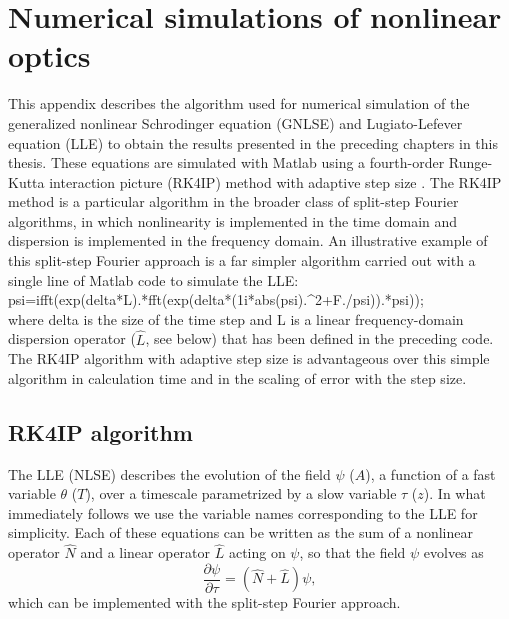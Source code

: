 \chapter{Numerical simulations of nonlinear optics}
 \label{app:numericalsims}



This appendix describes the algorithm used for numerical simulation of the generalized nonlinear Schrodinger equation (GNLSE) and Lugiato-Lefever equation (LLE) to obtain the results presented in the preceding chapters in this thesis. These equations are simulated with Matlab using a fourth-order Runge-Kutta interaction picture (RK4IP) method \cite{Hult2007} with adaptive step size \cite{Heidt2009}. The RK4IP method is a particular algorithm in the broader class of split-step Fourier algorithms, in which nonlinearity is implemented in the time domain and dispersion is implemented in the frequency domain. An illustrative example of this split-step Fourier approach is a far simpler algorithm carried out with a single line of Matlab code to simulate the LLE: \\
{\selectfont psi=ifft(exp(delta*L).*fft(exp(delta*(1i*abs(psi).\string^2+F./psi)).*psi));}\\
where {\selectfont delta} is the size of the time step and {\selectfont L} is a linear frequency-domain dispersion operator ($\hat{L}$, see below) that has been defined in the preceding code. The RK4IP algorithm with adaptive step size is advantageous over this simple algorithm in calculation time and in the scaling of error with the step size.

\section{RK4IP algorithm}

The LLE (NLSE) describes the evolution of the field $\psi$ ($A$), a function of a fast variable $\theta$ ($T$), over a timescale parametrized by a slow variable $\tau$ ($z$). In what immediately follows we use the variable names corresponding to the LLE for simplicity. Each of these equations can be written as the sum of a nonlinear operator $\hat{N}$ and a linear operator $\hat{L}$ acting on $\psi$, so that the field $\psi$ evolves as
\begin{equation}
\frac{\partial\psi}{\partial\tau}=(\hat{N}+\hat{L})\psi,
\end{equation}
which can be implemented with the split-step Fourier approach.

